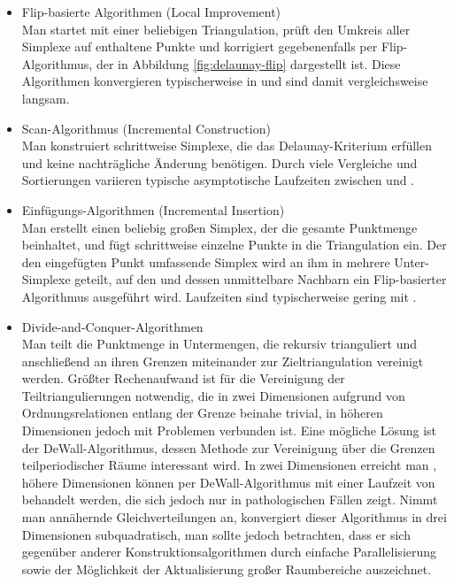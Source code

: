 \begin{itemize}
\item Flip-basierte Algorithmen (Local Improvement)\\
  Man startet mit einer beliebigen Triangulation, prüft den Umkreis aller Simplexe auf enthaltene Punkte und korrigiert gegebenenfalls per Flip-Algorithmus, der in Abbildung \ref{fig:delaunay-flip} dargestellt ist.
  Diese Algorithmen konvergieren typischerweise in  und sind damit vergleichsweise langsam.

\item Scan-Algorithmus (Incremental Construction)\\
  Man konstruiert schrittweise Simplexe, die das Delaunay-Kriterium erfüllen und keine nachträgliche Änderung benötigen.
  Durch viele Vergleiche und Sortierungen variieren typische asymptotische Laufzeiten zwischen  und .

\item Einfügungs-Algorithmen (Incremental Insertion)\\
  Man erstellt einen beliebig großen Simplex, der die gesamte Punktmenge beinhaltet, und fügt schrittweise einzelne Punkte in die Triangulation ein.
  Der den eingefügten Punkt umfassende Simplex wird an ihm in mehrere Unter-Simplexe geteilt, auf den und dessen unmittelbare Nachbarn ein Flip-basierter Algorithmus ausgeführt wird.
  Laufzeiten sind typischerweise gering mit .

\item Divide-and-Conquer-Algorithmen\\
  Man teilt die Punktmenge in Untermengen, die rekursiv trianguliert und anschließend an ihren Grenzen miteinander zur Zieltriangulation vereinigt werden.
  Größter Rechenaufwand ist für die Vereinigung der Teiltriangulierungen notwendig, die in zwei Dimensionen aufgrund von Ordnungsrelationen entlang der Grenze beinahe trivial, in höheren Dimensionen jedoch mit Problemen verbunden ist.
  Eine mögliche Lösung ist der DeWall-Algorithmus\cite{cignoni_dewall:_1998}, dessen Methode zur Vereinigung über die Grenzen teilperiodischer Räume interessant wird.
  In zwei Dimensionen erreicht man , höhere Dimensionen können per DeWall-Algorithmus mit einer Laufzeit von  behandelt werden, die sich jedoch nur in pathologischen Fällen zeigt.
  Nimmt man annähernde Gleichverteilungen an, konvergiert dieser Algorithmus in drei Dimensionen subquadratisch, man sollte jedoch betrachten, dass er sich gegenüber anderer Konstruktionsalgorithmen durch einfache Parallelisierung sowie der Möglichkeit der Aktualisierung großer Raumbereiche auszeichnet.


\end{itemize}
